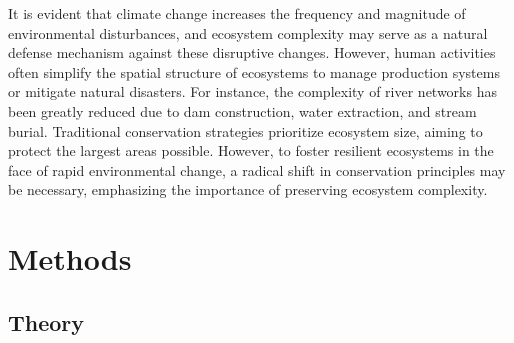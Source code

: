 \documentclass[11pt, class=article, crop=false]{standalone}
\begin{document}
It is evident that climate change increases the frequency and magnitude of environmental disturbances, and ecosystem complexity may serve as a natural defense mechanism against these disruptive changes.
However, human activities often simplify the spatial structure of ecosystems to manage production systems or mitigate natural disasters.
For instance, the complexity of river networks has been greatly reduced due to dam construction, water extraction, and stream burial.
Traditional conservation strategies prioritize ecosystem size, aiming to protect the largest areas possible.
However, to foster resilient ecosystems in the face of rapid environmental change, a radical shift in conservation principles may be necessary, emphasizing the importance of preserving ecosystem complexity.




\section{Methods}

\subsection{Theory}
\end{document}
